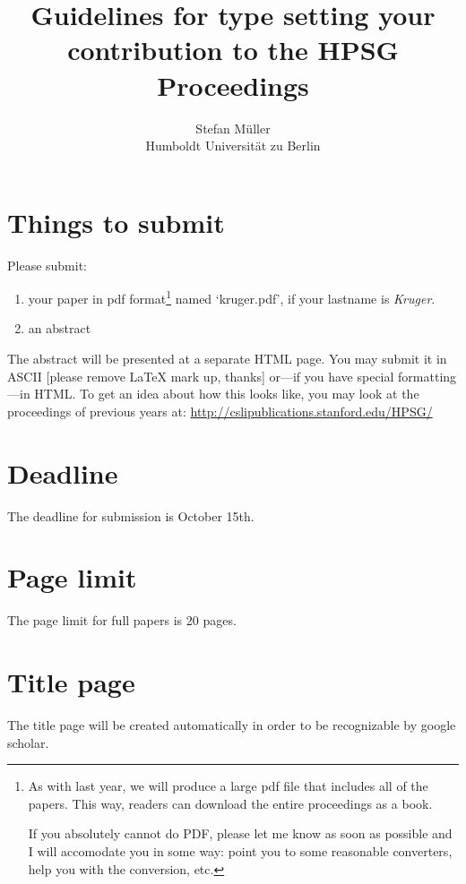 \documentclass[11pt,a4paper,fleqn]{article}
\title{Guidelines for type setting your contribution to the HPSG Proceedings}
\author{Stefan Müller\\
Humboldt Universität zu Berlin}
\begin{document}
\maketitle


\section{Things to submit}

Please submit:
\begin{enumerate}
\item your paper in pdf format\footnote{
As with last year, we will produce a large pdf file that includes all
of the papers.  This way, readers can download the entire proceedings
as a book.

If you absolutely cannot do PDF, please let me know as soon as
possible and I will accomodate you in some way: point you to some
reasonable converters, help you with the conversion, etc.}
%
 named `kruger.pdf', if your lastname is \emph{Kruger}.



\item an abstract
\end{enumerate}
The abstract will be presented at a separate HTML page. You may submit it in ASCII [please remove \LaTeX{} mark up, thanks]
or---if you have special formatting---in HTML. 
To get an idea about how this looks like,
you may look at the proceedings of previous years at:\newline
\url{http://cslipublications.stanford.edu/HPSG/}\section{Deadline}

The deadline for submission is October 15th.

\section{Page limit}

The page limit for full papers is 20 pages.


\section{Title page}


The title page will be created automatically in order to be recognizable by google scholar.
\end{document}
